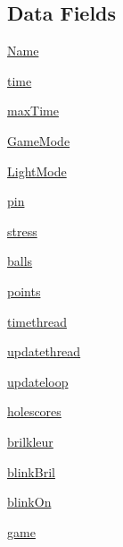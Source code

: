 \subsection*{Data Fields}
\begin{DoxyCompactItemize}
\item 
\hyperlink{classgame_1_1_player_1_1player_aa5998168cabfb2b2e41151349077812c}{Name}
\item 
\hyperlink{classgame_1_1_player_1_1player_a70c092a6aebace0b1ea406e14da78a40}{time}
\item 
\hyperlink{classgame_1_1_player_1_1player_aa820f7e11b025b06f4eeb0ad7581ad34}{max\+Time}
\item 
\hyperlink{classgame_1_1_player_1_1player_aaf5ef5a17b53e9997c837b07015589de}{Game\+Mode}
\item 
\hyperlink{classgame_1_1_player_1_1player_adbeef4da431e7d5e416c32ee188659f7}{Light\+Mode}
\item 
\hyperlink{classgame_1_1_player_1_1player_aed45ca508d997dd992682abff8790bde}{pin}
\item 
\hyperlink{classgame_1_1_player_1_1player_a32238a7b64cb50d84a8aaa16991856e7}{stress}
\item 
\hyperlink{classgame_1_1_player_1_1player_a07f043935f9198f29c102e457f37e2a7}{balls}
\item 
\hyperlink{classgame_1_1_player_1_1player_ab9a89211ecb71d18bbd259853fda1c54}{points}
\item 
\hyperlink{classgame_1_1_player_1_1player_abdbd1aa902babb2b61d19e44dcd88412}{timethread}
\item 
\hyperlink{classgame_1_1_player_1_1player_a3924cdbb3a2e56cd1ff60d8562e29551}{updatethread}
\item 
\hyperlink{classgame_1_1_player_1_1player_a36c4719a5155181787e577197de2f4fd}{updateloop}
\item 
\hyperlink{classgame_1_1_player_1_1player_aeb2f8044324fe09477addfe8b6cc2ba2}{holescores}
\item 
\hyperlink{classgame_1_1_player_1_1player_a2af8a98688fb3fdd4af4ccf4a3aeeb9a}{brilkleur}
\item 
\hyperlink{classgame_1_1_player_1_1player_a7414c080ff0224b59be39eb949eec0e4}{blink\+Bril}
\item 
\hyperlink{classgame_1_1_player_1_1player_a64e24d506f270a01dde24d266af439dd}{blink\+On}
\item 
\hyperlink{classgame_1_1_player_1_1player_ab587deac2ae34c126e6222afedb790ea}{game}
\end{DoxyCompactItemize}


